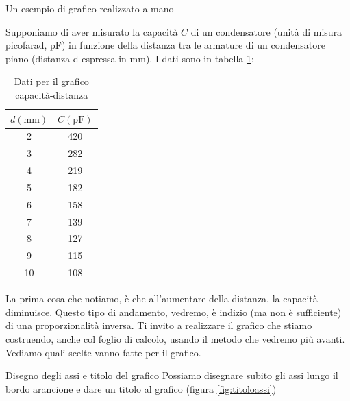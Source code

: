 \documentclass[12pt,a4paper,oneside]{book}
\makeatletter
\renewcommand{\section}{\@startsection{section}{1}{\z@}
{-4ex \@plus -1ex \@minus -.4ex}
{1ex \@plus.2ex }
{\normalfont\large\sffamily\bfseries}}
\renewcommand{\subsection}{\@startsection {subsection}{2}{\z@}
{-3ex \@plus -0.1ex \@minus -.4ex}
{0.5ex \@plus.2ex }
{\color[rgb]{0.141,0.596,0.749}\normalfont\sffamily\bfseries}}
\theoremstyle{esercizio}
\makeatother
\begin{document}
\section{Un esempio di grafico realizzato a mano}

Supponiamo di aver misurato la capacità $C$ di un condensatore (unità di misura picofarad, pF)  in funzione della distanza tra le armature di un condensatore piano (distanza d espressa in mm). I dati sono in tabella \ref{tab:condensatore}: 

\begin{table}
\begin{center}
{
\def\arraystretch{1.5} %
\begin{tabular}{|c|c|}
\hline 
 $d\left( \si{\milli\meter}\right)$ & $C \left( \si{\pico\farad}\right)$   \\
\hline
2 & 420\\
3 &  282 \\
4 &  219 \\
5 & 182 \\
6 & 158 \\
7 &  139\\
8 &  127\\
9  & 115\\
10 & 108\\
\hline
\end{tabular}
}
\caption{Dati per il grafico capacità-distanza}
\label{tab:condensatore}
\end{center}
\end{table}
La prima cosa che notiamo, è che all'aumentare della distanza, la capacità diminuisce. Questo tipo di andamento, vedremo, è indizio (ma non è sufficiente) di una proporzionalità inversa. Ti invito a realizzare il grafico che stiamo costruendo, anche col foglio di calcolo, usando il metodo che vedremo più avanti. Vediamo quali scelte vanno fatte per il grafico.
\subsection{Disegno degli assi e titolo del grafico}
Possiamo disegnare subito gli assi lungo il bordo arancione e dare un titolo al grafico (figura \ref{fig:titoloassi})
\end{document}
